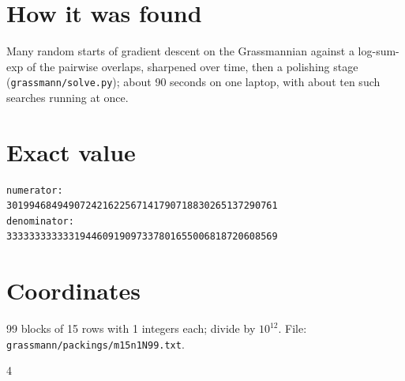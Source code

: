 \documentclass[11pt,a4paper]{article}
\begin{document}
\section{How it was found}
Many random starts of gradient descent on the Grassmannian against a log-sum-exp of the pairwise overlaps, sharpened over time, then a polishing stage (\texttt{grassmann/solve.py}); about 90 seconds on one laptop, with about ten such searches running at once.


\appendix
\section{Exact value}
{\small
\begin{verbatim}
numerator:
301994684949072421622567141790718830265137290761
denominator:
333333333333194460919097337801655006818720608569
\end{verbatim}}

\section{Coordinates}
99 blocks of 15 rows with 1 integers each; divide by $10^{12}$. File: \texttt{grassmann/packings/m15n1N99.txt}.
{\tiny
\begin{multicols}{4}
\end{multicols}}
\end{document}
